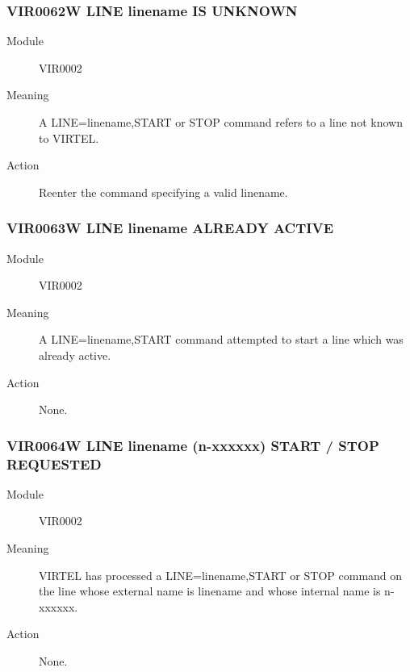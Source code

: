 \documentclass[letterpaper,10pt,english]{sphinxmanual}
\begin{document}
\subsubsection{VIR0062W LINE linename IS UNKNOWN}
\label{\detokenize{messages:vir0062w-line-linename-is-unknown}}\begin{description}
\item[{Module}] \leavevmode
VIR0002

\item[{Meaning}] \leavevmode
A LINE=linename,START or STOP command refers to a line not known to VIRTEL.

\item[{Action}] \leavevmode
Reenter the command specifying a valid linename.

\end{description}


\subsubsection{VIR0063W LINE linename ALREADY ACTIVE}
\label{\detokenize{messages:vir0063w-line-linename-already-active}}\begin{description}
\item[{Module}] \leavevmode
VIR0002

\item[{Meaning}] \leavevmode
A LINE=linename,START command attempted to start a line which was already active.

\item[{Action}] \leavevmode
None.

\end{description}


\subsubsection{VIR0064W LINE linename (n-xxxxxx) START / STOP REQUESTED}
\label{\detokenize{messages:vir0064w-line-linename-n-xxxxxx-start-stop-requested}}\begin{description}
\item[{Module}] \leavevmode
VIR0002

\item[{Meaning}] \leavevmode
VIRTEL has processed a LINE=linename,START or STOP command on the line whose external name is linename and whose internal name is n-xxxxxx.

\item[{Action}] \leavevmode
None.

\end{description}
\end{document}
